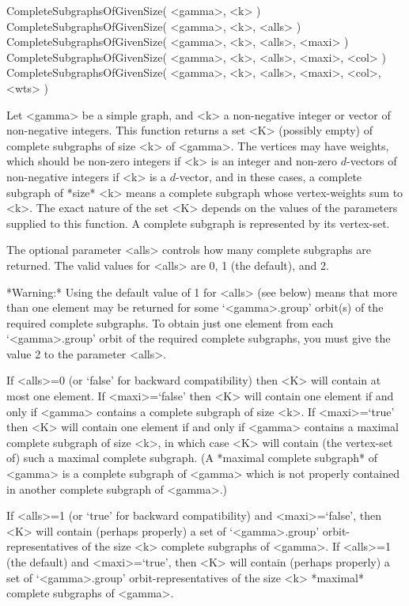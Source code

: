 \>CompleteSubgraphsOfGivenSize( <gamma>, <k> )
\>CompleteSubgraphsOfGivenSize( <gamma>, <k>, <alls> )
\>CompleteSubgraphsOfGivenSize( <gamma>, <k>, <alls>, <maxi> )
\>CompleteSubgraphsOfGivenSize( <gamma>, <k>, <alls>, <maxi>, <col> )
\>CompleteSubgraphsOfGivenSize( <gamma>, <k>, <alls>, <maxi>, <col>, <wts> ) 

Let <gamma> be a simple graph, and <k> a non-negative integer or vector
of non-negative integers.  This function returns a set <K> (possibly
empty) of complete subgraphs of size <k> of <gamma>.  The vertices may
have weights, which should be non-zero integers if <k> is an integer and
non-zero $d$-vectors of non-negative integers if <k> is a $d$-vector,
and in these cases, a complete subgraph of *size* <k> means a complete
subgraph whose vertex-weights sum to <k>.  The exact nature of the set
<K> depends on the values of the parameters supplied to this function. A
complete subgraph is represented by its vertex-set.

The optional parameter <alls> controls how many complete subgraphs are
returned. The valid values for <alls> are 0, 1 (the default), and 2.

*Warning:* Using the default value of 1 for <alls> (see below) means that
more than one element may be returned for some `<gamma>.group' orbit(s)
of the required complete subgraphs.  To obtain just one element from each
`<gamma>.group' orbit of the required complete subgraphs, you must give
the value 2 to the parameter <alls>.

If <alls>=0 (or `false' for backward compatibility) then <K> will
contain at most one element.  If <maxi>=`false' then <K> will contain one
element if and only if <gamma> contains a complete subgraph of size <k>.
If <maxi>=`true' then <K> will contain one element if and only if <gamma>
contains a maximal complete subgraph of size <k>, in which case <K>
will contain (the vertex-set of) such a maximal complete subgraph.
(A *maximal complete subgraph* of <gamma> is a complete subgraph of
<gamma> which is not properly contained in another complete subgraph
of <gamma>.)

If <alls>=1 (or `true' for backward compatibility) and <maxi>=`false',
then <K> will contain (perhaps properly) a set of `<gamma>.group'
orbit-representatives of the size <k> complete subgraphs of <gamma>.
If <alls>=1 (the default) and <maxi>=`true', then <K> will contain
(perhaps properly) a set of `<gamma>.group' orbit-representatives of
the size <k> *maximal* complete subgraphs of <gamma>.

